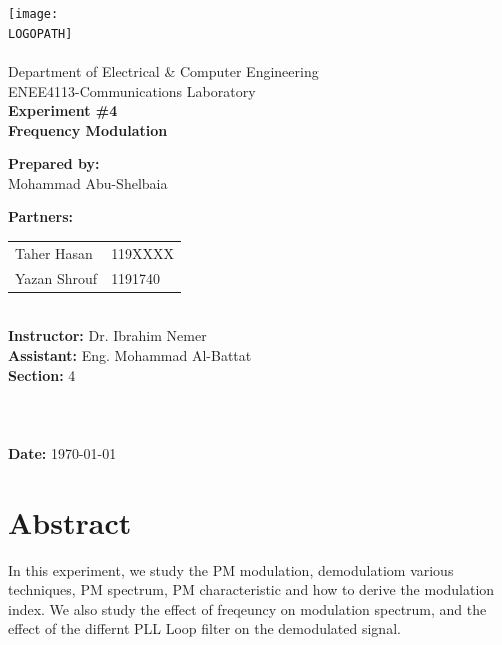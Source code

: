 \documentclass[12pt]{article}
\def \LOGOPATH {assets/img/birzeit-logo.png}
\def \DEPARTEMENT {Department of Electrical \& Computer Engineering}
\def \COURSENUM {ENEE4113}
\def \COURSENAME {Communications Laboratory}
\def \REPORTTITLE {Frequency Modulation}
\def \STUDENTNAME {Mohammad Abu-Shelbaia}
\def \STUDENTID {1200198}
\def \INSTRUCTOR {Dr. Ibrahim Nemer}
\def \ASSISTANT {Eng. Mohammad Al-Battat}
\def \PARTNERAN {Taher Hasan}
\def \PARTNERAID {119XXXX}
\def \PARTNERBN {Yazan Shrouf}
\def \PARTNERBID {1191740}
\def \REPORTNUM {4}
\begin{document}

\begin{titlepage}
    \vfill
    \begin{center}
        \texttt{[image: \\LOGOPATH]} \\
        \hfill \\
        \Large{\DEPARTEMENT} \\
        \Large{\COURSENUM\;-\;\COURSENAME} \\
        \vfill
        \textbf{\LARGE{Experiment \#\REPORTNUM}} \\
        \textbf{\LARGE{\REPORTTITLE}}
    \end{center}
    \vfill
    \begin{flushleft}
        \Large{\textbf{Prepared by:}\\ \STUDENTNAME\quad\STUDENTID} \\
        \Large{\textbf{Partners:}\\ 
        \begin{tabular}{@{}l@{\quad}l}
            \PARTNERAN & \PARTNERAID \\
            \PARTNERBN & \PARTNERBID \\
        \end{tabular}} \\
        \Large{\textbf{Instructor:} \INSTRUCTOR} \\
        \Large{\textbf{Assistant:} \ASSISTANT} \\
        \Large{\textbf{Section:} 4}\\
        \LARGE{\textbf{ }}\\
        \LARGE{\textbf{ }}\\
        \LARGE{\textbf{ }}\\
        \Large{\textbf{Date:} \today}\\
    \end{flushleft}
    \vfill
\end{titlepage}
{
    \centering
    \section*{Abstract}
    In this experiment, we study the PM modulation, demodulatiom various techniques, PM spectrum, PM characteristic and how to derive the modulation index. We also study the effect of freqeuncy on modulation spectrum, and the effect of the differnt PLL Loop filter on the demodulated signal.
    \clearpage
}
\end{document}
